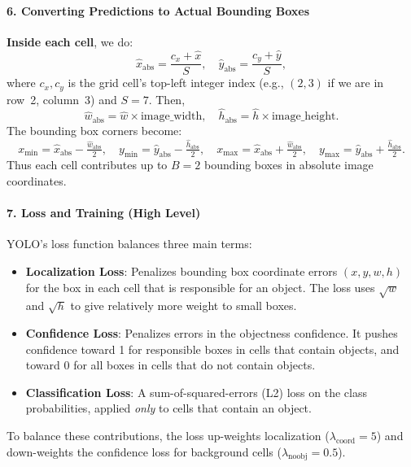\begin{enrichment}
\begin{enrichment}
    \paragraph{6. Converting Predictions to Actual Bounding Boxes}
    \textbf{Inside each cell}, we do:
    \[
    \hat{x}_\text{abs} = \frac{c_x + \hat{x}}{S}, \quad
    \hat{y}_\text{abs} = \frac{c_y + \hat{y}}{S},
    \]
    where \(c_x, c_y\) is the grid cell’s top-left integer index (e.g., \((2,3)\) if we are in row~2, column~3) and \(S=7\). Then,
    \[
    \hat{w}_\text{abs} = \hat{w} \times \text{image\_width}, \quad
    \hat{h}_\text{abs} = \hat{h} \times \text{image\_height}.
    \]
    The bounding box corners become:
    \[
    x_{\text{min}} = \hat{x}_\text{abs} - \tfrac{\hat{w}_\text{abs}}{2}, \quad
    y_{\text{min}} = \hat{y}_\text{abs} - \tfrac{\hat{h}_\text{abs}}{2}, 
    \quad
    x_{\text{max}} = \hat{x}_\text{abs} + \tfrac{\hat{w}_\text{abs}}{2}, 
    \quad
    y_{\text{max}} = \hat{y}_\text{abs} + \tfrac{\hat{h}_\text{abs}}{2}.
    \]
    Thus each cell contributes up to $B=2$ bounding boxes in absolute image coordinates.
    
    \paragraph{7. Loss and Training (High Level)}
    YOLO’s loss function balances three main terms:
    \begin{itemize}
    	\item \textbf{Localization Loss}: Penalizes bounding box coordinate errors \((x, y, w, h)\) for the box in each cell that is responsible for an object. The loss uses \(\sqrt{w}\) and \(\sqrt{h}\) to give relatively more weight to small boxes.
    	\item \textbf{Confidence Loss}: Penalizes errors in the objectness confidence. It pushes confidence toward 1 for responsible boxes in cells that contain objects, and toward 0 for all boxes in cells that do not contain objects.
    	\item \textbf{Classification Loss}: A sum-of-squared-errors (L2) loss on the class probabilities, applied \emph{only} to cells that contain an object.
    \end{itemize}
    To balance these contributions, the loss up-weights localization (\(\lambda_{\text{coord}} = 5\)) and down-weights the confidence loss for background cells (\(\lambda_{\text{noobj}} = 0.5\)).
    

\end{enrichment}
\end{enrichment}
